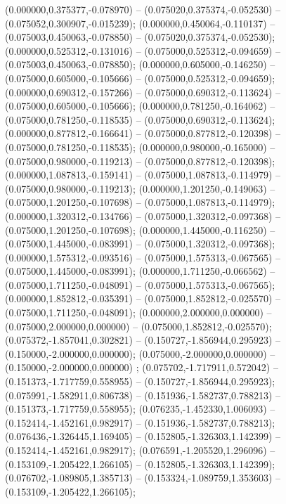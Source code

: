  (0.000000,0.375377,-0.078970) -- (0.075020,0.375374,-0.052530) -- (0.075052,0.300907,-0.015239);
 (0.000000,0.450064,-0.110137) -- (0.075003,0.450063,-0.078850) -- (0.075020,0.375374,-0.052530);
 (0.000000,0.525312,-0.131016) -- (0.075000,0.525312,-0.094659) -- (0.075003,0.450063,-0.078850);
 (0.000000,0.605000,-0.146250) -- (0.075000,0.605000,-0.105666) -- (0.075000,0.525312,-0.094659);
 (0.000000,0.690312,-0.157266) -- (0.075000,0.690312,-0.113624) -- (0.075000,0.605000,-0.105666);
 (0.000000,0.781250,-0.164062) -- (0.075000,0.781250,-0.118535) -- (0.075000,0.690312,-0.113624);
 (0.000000,0.877812,-0.166641) -- (0.075000,0.877812,-0.120398) -- (0.075000,0.781250,-0.118535);
 (0.000000,0.980000,-0.165000) -- (0.075000,0.980000,-0.119213) -- (0.075000,0.877812,-0.120398);
 (0.000000,1.087813,-0.159141) -- (0.075000,1.087813,-0.114979) -- (0.075000,0.980000,-0.119213);
 (0.000000,1.201250,-0.149063) -- (0.075000,1.201250,-0.107698) -- (0.075000,1.087813,-0.114979);
 (0.000000,1.320312,-0.134766) -- (0.075000,1.320312,-0.097368) -- (0.075000,1.201250,-0.107698);
 (0.000000,1.445000,-0.116250) -- (0.075000,1.445000,-0.083991) -- (0.075000,1.320312,-0.097368);
 (0.000000,1.575312,-0.093516) -- (0.075000,1.575313,-0.067565) -- (0.075000,1.445000,-0.083991);
 (0.000000,1.711250,-0.066562) -- (0.075000,1.711250,-0.048091) -- (0.075000,1.575313,-0.067565);
 (0.000000,1.852812,-0.035391) -- (0.075000,1.852812,-0.025570) -- (0.075000,1.711250,-0.048091);
 (0.000000,2.000000,0.000000) -- (0.075000,2.000000,0.000000) -- (0.075000,1.852812,-0.025570);
 (0.075372,-1.857041,0.302821) -- (0.150727,-1.856944,0.295923) -- (0.150000,-2.000000,0.000000);
 (0.075000,-2.000000,0.000000) -- (0.150000,-2.000000,0.000000) ;
 (0.075702,-1.717911,0.572042) -- (0.151373,-1.717759,0.558955) -- (0.150727,-1.856944,0.295923);
 (0.075991,-1.582911,0.806738) -- (0.151936,-1.582737,0.788213) -- (0.151373,-1.717759,0.558955);
 (0.076235,-1.452330,1.006093) -- (0.152414,-1.452161,0.982917) -- (0.151936,-1.582737,0.788213);
 (0.076436,-1.326445,1.169405) -- (0.152805,-1.326303,1.142399) -- (0.152414,-1.452161,0.982917);
 (0.076591,-1.205520,1.296096) -- (0.153109,-1.205422,1.266105) -- (0.152805,-1.326303,1.142399);
 (0.076702,-1.089805,1.385713) -- (0.153324,-1.089759,1.353603) -- (0.153109,-1.205422,1.266105);
